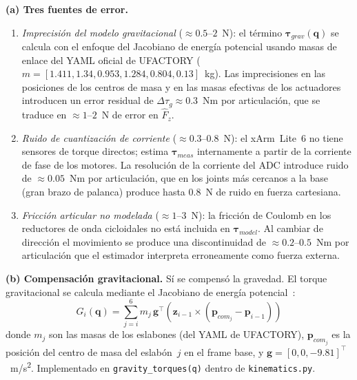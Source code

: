 \documentclass[journal,10pt,twoside]{IEEEtran}
\begin{document}
\textbf{(a) Tres fuentes de error.}
\begin{enumerate}[label=\roman*.]
  \item \textit{Imprecisión del modelo gravitacional} ($\approx 0.5$--$2$~N):
        el término $\bm{\tau}_{grav}(\bm{q})$ se calcula con el enfoque
        del Jacobiano de energía potencial usando masas de enlace del
        YAML oficial de UFACTORY
        ($m = [1.411, 1.34, 0.953, 1.284, 0.804, 0.13]$~kg). Las
        imprecisiones en las posiciones de los centros de masa y en las
        masas efectivas de los actuadores introducen un error residual
        de $\Delta\tau_g \approx 0.3$~Nm por articulación, que se
        traduce en $\approx 1$--$2$~N de error en $\hat{F}_z$.
  \item \textit{Ruido de cuantización de corriente} ($\approx 0.3$--$0.8$~N):
        el xArm~Lite~6 no tiene sensores de torque directos; estima
        $\bm{\tau}_{meas}$ internamente a partir de la corriente de
        fase de los motores. La resolución de la corriente del ADC
        introduce ruido de $\approx 0.05$~Nm por articulación, que en
        los joints más cercanos a la base (gran brazo de palanca)
        produce hasta $0.8$~N de ruido en fuerza cartesiana.
  \item \textit{Fricción articular no modelada} ($\approx 1$--$3$~N):
        la fricción de Coulomb en los reductores de onda cicloidales
        no está incluida en $\bm{\tau}_{model}$. Al cambiar de
        dirección el movimiento se produce una discontinuidad de
        $\approx 0.2$--$0.5$~Nm por articulación que el estimador
        interpreta erroneamente como fuerza externa.
\end{enumerate}

\textbf{(b) Compensación gravitacional.}
Sí se compensó la gravedad. El torque gravitacional se calcula mediante
el Jacobiano de energía potencial~\cite{siciliano2009}:
\begin{equation}
  G_i(\bm{q}) = \sum_{j=i}^{6} m_j \, \bm{g}^\top
                \left( \bm{z}_{i-1} \times (\bm{p}_{com_j} - \bm{p}_{i-1}) \right)
  \label{eq:gravity}
\end{equation}
donde $m_j$ son las masas de los eslabones (del YAML de UFACTORY),
$\bm{p}_{com_j}$ es la posición del centro de masa del eslabón~$j$
en el frame base, y $\bm{g} = [0, 0, -9.81]^\top$~m/s\textsuperscript{2}.
Implementado en \texttt{gravity\_torques(q)} dentro de
\texttt{kinematics.py}.
\end{document}
